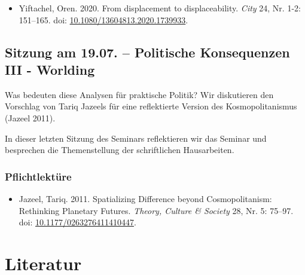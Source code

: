 \documentclass[
  ngerman,
]{article}
\providecommand{\tightlist}{%
  \setlength{\itemsep}{0pt}\setlength{\parskip}{0pt}}
\begin{document}
\begin{itemize}
\tightlist
\item
  Yiftachel, Oren. 2020. From displacement to displaceability. \emph{City} 24, Nr. 1-2: 151--165. doi: \href{https://doi.org/10.1080/13604813.2020.1739933}{10.1080/13604813.2020.1739933}.
\end{itemize}

\hypertarget{sitzung-am-19.07.-politische-konsequenzen-iii---worlding}{%
\subsection{Sitzung am 19.07. -- Politische Konsequenzen III - Worlding}\label{sitzung-am-19.07.-politische-konsequenzen-iii---worlding}}

Was bedeuten diese Analysen für praktische Politik? Wir diskutieren den Vorschlag von Tariq Jazeels für eine reflektierte Version des Kosmopolitanismus (Jazeel 2011).

In dieser letzten Sitzung des Seminars reflektieren wir das Seminar und besprechen die Themenstellung der schriftlichen Hausarbeiten.

\hypertarget{pflichtlektuxfcre-12}{%
\subsubsection*{Pflichtlektüre}\label{pflichtlektuxfcre-12}}

\begin{itemize}
\tightlist
\item
  Jazeel, Tariq. 2011. Spatializing Difference beyond Cosmopolitanism: Rethinking Planetary Futures. \emph{Theory, Culture \& Society} 28, Nr. 5: 75--97. doi: \href{https://doi.org/10.1177/0263276411410447}{10.1177/0263276411410447}.
\end{itemize}

\pagebreak

\hypertarget{literatur}{%
\section*{Literatur}\label{literatur}}
\end{document}
